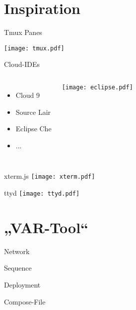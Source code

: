 \documentclass[compress]{beamer}
\begin{document}
\section{Inspiration}
\begin{frame}{Tmux Panes}

  \texttt{[image: tmux.pdf]}
\end{frame}
\begin{frame}{Cloud-IDEs}
  \begin{columns}
    \begin{itemize}
      \item Cloud 9
      \item Source Lair
      \item Eclipse Che
      \item ...
    \end{itemize}

    \texttt{[image: eclipse.pdf]}
  \end{columns}
\end{frame}
\begin{frame}{xterm.js}
  \texttt{[image: xterm.pdf]}
\end{frame}
\begin{frame}{ttyd}
  \texttt{[image: ttyd.pdf]}
\end{frame}

\section{„VAR-Tool“}
\begin{frame}{}
\end{frame}
\begin{frame}{}
\end{frame}
\begin{frame}{Network}
\end{frame}
\begin{frame}{Sequence}
\end{frame}
\begin{frame}{Deployment}
\end{frame}
\begin{frame}{Compose-File}
\end{frame}
\end{document}
